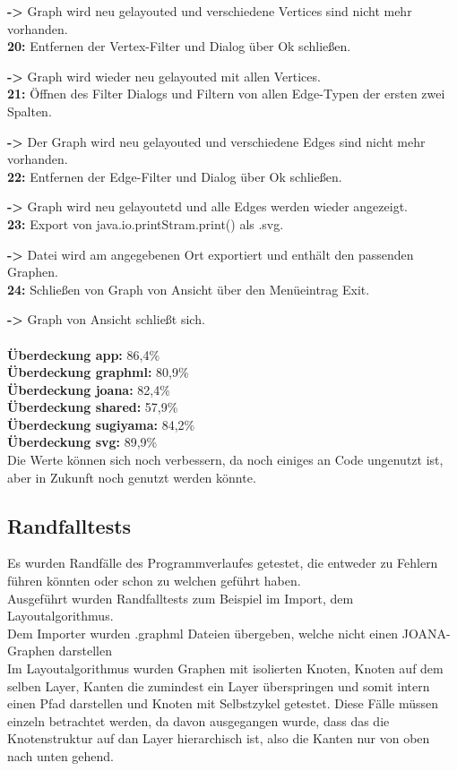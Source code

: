 \textbf{->} Graph wird neu gelayouted und verschiedene Vertices sind nicht mehr vorhanden.\\
\textbf{20:} Entfernen der Vertex-Filter und Dialog über Ok schließen.

\textbf{->} Graph wird wieder neu gelayouted mit allen Vertices.\\
\textbf{21:} Öffnen des Filter Dialogs und Filtern von allen Edge-Typen der ersten zwei Spalten.

\textbf{->} Der Graph wird neu gelayouted und verschiedene Edges sind nicht mehr vorhanden.\\
\textbf{22:} Entfernen der Edge-Filter und Dialog über Ok schließen.

\textbf{->} Graph wird neu gelayoutetd und alle Edges werden wieder angezeigt.\\
\textbf{23:} Export von java.io.printStram.print() als .svg.

\textbf{->} Datei wird am angegebenen Ort exportiert und enthält den passenden Graphen.\\
\textbf{24:} Schließen von Graph von Ansicht über den Menüeintrag Exit.

\textbf{->} Graph von Ansicht schließt sich.\\
\\
\textbf{Überdeckung app: }86,4\%\\
\textbf{Überdeckung graphml: }80,9\%\\
\textbf{Überdeckung joana: }82,4\%\\
\textbf{Überdeckung shared: }57,9\%\\
\textbf{Überdeckung sugiyama: }84,2\%\\
\textbf{Überdeckung svg: }89,9\%\\
Die Werte können sich noch verbessern, da noch einiges an Code ungenutzt ist, aber in Zukunft noch genutzt werden könnte.


\subsection{Randfalltests}
Es wurden Randfälle des Programmverlaufes getestet, die entweder zu Fehlern führen könnten oder schon zu welchen geführt haben.\\
Ausgeführt wurden Randfalltests zum Beispiel im Import, dem Layoutalgorithmus.\\
Dem Importer wurden .graphml Dateien übergeben, welche nicht einen JOANA-Graphen darstellen\\
Im Layoutalgorithmus wurden Graphen mit isolierten Knoten, Knoten auf dem selben Layer, Kanten die zumindest ein Layer überspringen und somit intern einen Pfad darstellen und Knoten mit Selbstzykel getestet. Diese Fälle müssen einzeln betrachtet werden, da davon ausgegangen wurde, dass das die Knotenstruktur auf dan Layer hierarchisch ist, also die Kanten nur von oben nach unten gehend.\\


